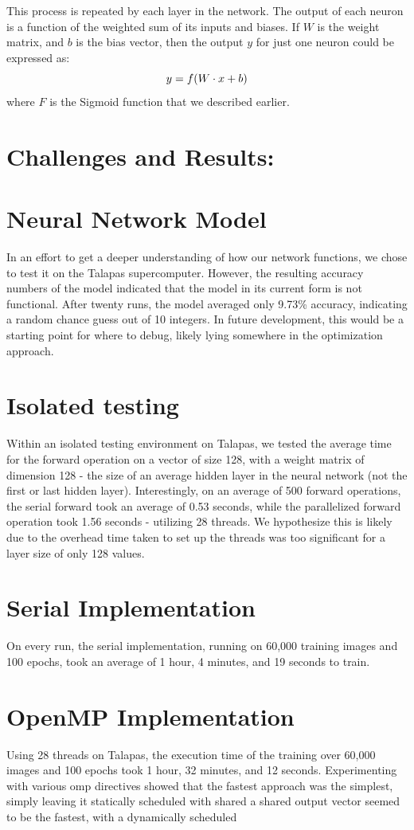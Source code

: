 \documentclass[12pt, twocolumn]{report}
\begin{document}
This process is repeated by each layer in the network. The output of each neuron is a function of the weighted sum of its inputs and biases. If
$W$ is the weight matrix, and $b$ is the bias vector, then the output $y$ for just one neuron could be expressed as:
\[
\Large
y = f(W \cdot x + b)
\]
where $F$ is the Sigmoid function that we described earlier.


\section*{Challenges and Results:}
\section*{Neural Network Model}
In an effort to get a deeper understanding of how our network functions, we chose to test it on the Talapas supercomputer. 
However, the resulting accuracy numbers of the model indicated that the model in its current form is not functional. After twenty runs,
the model averaged only 9.73\% accuracy, indicating a random chance guess out of 10 integers. In future development, this would be a starting point for where to debug, 
likely lying somewhere in the optimization approach. 


\section*{Isolated testing}
Within an isolated testing environment on Talapas, we tested the average time for the forward operation on a vector of size 128, with a weight matrix of dimension 128 -
the size of an average hidden layer in the neural network (not the first or last hidden layer). Interestingly, on an average of 500 forward operations, the
serial forward took an average of 0.53 seconds, while the parallelized forward operation took 1.56 seconds - utilizing 28 threads. We hypothesize this is likely due to the overhead time taken
to set up the threads was too significant for a layer size of only 128 values.




\section*{Serial Implementation}
On every run, the serial implementation, running on 60,000 training images and 100 epochs, took an average of 1 hour, 4 minutes, and 19 seconds to train.
\section*{OpenMP Implementation}
Using 28 threads on Talapas, the execution time of the training over 60,000 images and 100 epochs took 1 hour, 32 minutes, and 12 seconds. Experimenting with various
omp directives showed that the fastest approach was the simplest, simply leaving it statically scheduled with shared a shared output vector seemed to be the fastest, with a dynamically scheduled
\end{document}

